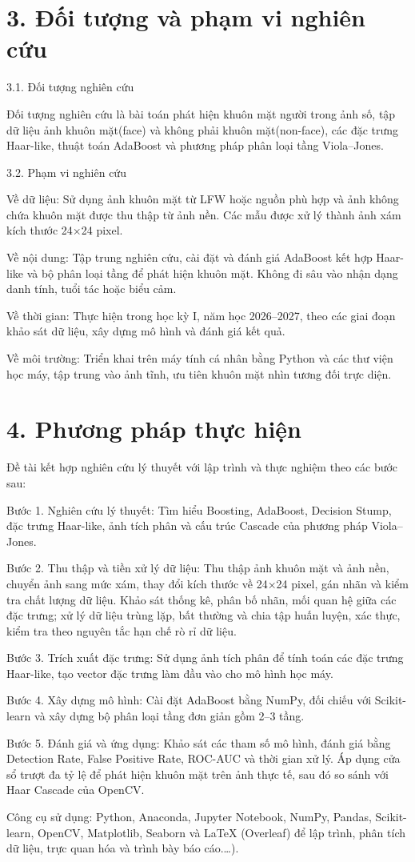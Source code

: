 \documentclass[12pt,a4paper,oneside]{report}
\begin{document}
\section*{3. Đối tượng và phạm vi nghiên cứu}
{3.1. Đối tượng nghiên cứu

Đối tượng nghiên cứu là bài toán phát hiện khuôn mặt người trong ảnh số, tập dữ liệu ảnh khuôn mặt(face) và không phải khuôn mặt(non-face), các đặc trưng Haar-like, thuật toán AdaBoost và phương pháp phân loại tầng Viola–Jones.

3.2. Phạm vi nghiên cứu

Về dữ liệu: Sử dụng ảnh khuôn mặt từ LFW hoặc nguồn phù hợp và ảnh không chứa khuôn mặt được thu thập từ ảnh nền. Các mẫu được xử lý thành ảnh xám kích thước 24×24 pixel.

Về nội dung: Tập trung nghiên cứu, cài đặt và đánh giá AdaBoost kết hợp Haar-like và bộ phân loại tầng để phát hiện khuôn mặt. Không đi sâu vào nhận dạng danh tính, tuổi tác hoặc biểu cảm.

Về thời gian: Thực hiện trong học kỳ I, năm học 2026–2027, theo các giai đoạn khảo sát dữ liệu, xây dựng mô hình và đánh giá kết quả.

Về môi trường: Triển khai trên máy tính cá nhân bằng Python và các thư viện học máy, tập trung vào ảnh tĩnh, ưu tiên khuôn mặt nhìn tương đối trực diện.}

\section*{4. Phương pháp thực hiện}
{Đề tài kết hợp nghiên cứu lý thuyết với lập trình và thực nghiệm theo các bước sau:

Bước 1. Nghiên cứu lý thuyết: Tìm hiểu Boosting, AdaBoost, Decision Stump, đặc trưng Haar-like, ảnh tích phân và cấu trúc Cascade của phương pháp Viola–Jones.

Bước 2. Thu thập và tiền xử lý dữ liệu: Thu thập ảnh khuôn mặt và ảnh nền, chuyển ảnh sang mức xám, thay đổi kích thước về 24×24 pixel, gán nhãn và kiểm tra chất lượng dữ liệu. Khảo sát thống kê, phân bố nhãn, mối quan hệ giữa các đặc trưng; xử lý dữ liệu trùng lặp, bất thường và chia tập huấn luyện, xác thực, kiểm tra theo nguyên tắc hạn chế rò rỉ dữ liệu.

Bước 3. Trích xuất đặc trưng: Sử dụng ảnh tích phân để tính toán các đặc trưng Haar-like, tạo vector đặc trưng làm đầu vào cho mô hình học máy.

Bước 4. Xây dựng mô hình: Cài đặt AdaBoost bằng NumPy, đối chiếu với Scikit-learn và xây dựng bộ phân loại tầng đơn giản gồm 2–3 tầng.

Bước 5. Đánh giá và ứng dụng: Khảo sát các tham số mô hình, đánh giá bằng Detection Rate, False Positive Rate, ROC-AUC và thời gian xử lý. Áp dụng cửa sổ trượt đa tỷ lệ để phát hiện khuôn mặt trên ảnh thực tế, sau đó so sánh với Haar Cascade của OpenCV.

Công cụ sử dụng: Python, Anaconda, Jupyter Notebook, NumPy, Pandas, Scikit-learn, OpenCV, Matplotlib, Seaborn và LaTeX (Overleaf) để lập trình, phân tích dữ liệu, trực quan hóa và trình bày báo cáo.\dots).}
\end{document}
